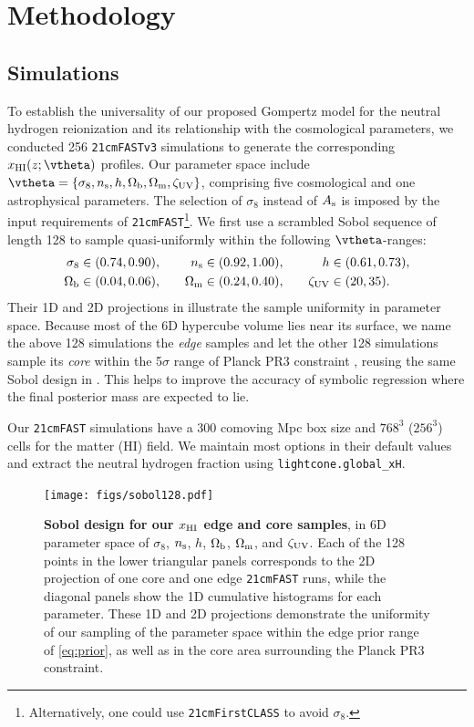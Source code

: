 \section*{Methodology}
\label{sec:methods}


\subsection*{Simulations}
\label{ssec:sims}

To establish the universality of our proposed Gompertz model for the
neutral hydrogen reionization and its relationship with the cosmological
parameters, we conducted 256 \texttt{21cmFASTv3} simulations to generate
the corresponding $x_\HI(z; \vtheta)$ profiles.
Our parameter space include $\vtheta = \{\sigma_8, \ns, h, \Omegab,
\Omegam, \zetaUV\}$, comprising five cosmological and one astrophysical
parameters.
The selection of $\sigma_8$ instead of $A_\mathrm{s}$ is imposed by the input
requirements of \texttt{21cmFAST}\footnote{Alternatively, one could use
\texttt{21cmFirstCLASS}\cite{Flitter2024} to avoid $\sigma_8$.}.
We first use a scrambled Sobol sequence \cite{Sobol1967, Owen1998} of
length 128 to sample quasi-uniformly within the following
$\vtheta$-ranges:
%
\begin{alignat}{3}
\label{eq:prior}
\sigma_8 &\in (0.74, 0.90), &\quad
n_\mathrm{s} &\in (0.92, 1.00), &\quad
h &\in (0.61, 0.73), \nonumber\\
\Omega_\mathrm{b} &\in (0.04, 0.06), &\quad
\Omega_\mathrm{m} &\in (0.24, 0.40), &\quad
\zeta_\mathrm{UV} &\in (20, 35).
\end{alignat}
%
Their 1D and 2D projections in  illustrate the sample
uniformity in parameter space.
Because most of the 6D hypercube volume lies near its surface, we name
the above 128 simulations the \emph{edge} samples and let the other 128
simulations sample its \emph{core} within the 5$\sigma$ range of Planck
PR3 constraint \cite{Planck2020a}, reusing the same Sobol design in
.
This helps to improve the accuracy of symbolic regression where the
final posterior mass are expected to lie.

Our \texttt{21cmFAST} simulations have a 300 comoving Mpc box size and
$768^3$ ($256^3$) cells for the matter (HI) field.
We maintain most options in their default values and extract the
neutral hydrogen fraction using \texttt{lightcone.global\_xH}.

\begin{figure}[tb]
\centering
\texttt{[image: figs/sobol128.pdf]}
\caption{\textbf{Sobol design for our $x_{\mathrm{HI}}$ edge and core samples},
in 6D parameter space of $\sigma_8$, $n_\mathrm{s}$, $h$, $\Omega_\mathrm{b}$, $\Omega_\mathrm{m}$,
and $\zeta_\mathrm{UV}$.
Each of the 128 points in the lower triangular panels corresponds to the
2D projection of one core and one edge \texttt{21cmFAST} runs, while the
diagonal panels show the 1D cumulative histograms for each parameter.
These 1D and 2D projections demonstrate the uniformity of our sampling
of the parameter space within the edge prior range of \cref{eq:prior},
as well as in the core area surrounding the Planck PR3 constraint.}
\label{fig:sobol}
\end{figure}

